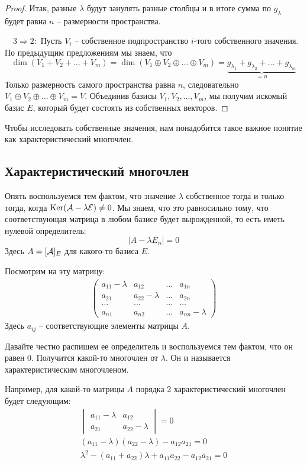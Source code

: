 \begin{proof}
    \quad Итак, разные $\lambda$ будут занулять разные столбцы и в итоге сумма по $g_\lambda$ будет равна $n$ -- размерности пространства.

    $\quad 3 \Rightarrow 2:$ Пусть $V_i$ -- собственное подпространство $i$-того собственного значения.
    По предыдущим предложениям мы знаем, что \[ \dim(V_1 + V_2 + \dots + V_m) 
    = \dim(V_1 \oplus V_2 \oplus \dots \oplus V_m)
    =  \underbrace{g_{\lambda_1} + g_{\lambda_2} + \dots + g_{\lambda_m}}_{ = n} \]
    \quad Только размерность самого пространства равна $n$, следовательно $V_1 \oplus V_2 \oplus \dots \oplus V_m = V$. 
    Объединив базисы $V_1, V_2, \dots, V_m$, мы получим искомый базис $E$, который будет состоять из собственных векторов.
\end{proof}

\vspace{5mm}

Чтобы исследовать собственные значения, нам понадобится такое важное понятие как характеристический многочлен.

\subsection{Характеристический многочлен}
Опять воспользуемся тем фактом, что значение $\lambda$ собственное тогда и только тогда, когда $\operatorname{Ker}(\mathcal{A} - \lambda\mathcal{E}) \neq 0$.
Мы знаем, что это равносильно тому, что соответствующая матрица в любом базисе будет вырожденной, то есть иметь нулевой определитель: \[ |A - \lambda E_n| = 0 \]
Здесь $A = [\mathcal{A}]_E$ для какого-то базиса $E$.

Посмотрим на эту матрицу:
\begin{gather*}
    \begin{pmatrix}
        a_{11} - \lambda & a_{12} & \dots & a_{1n} \\
        a_{21} & a_{22} - \lambda  & \dots & a_{2n} \\
        \dots & \dots & \dots & \dots \\
        a_{n1} & a_{n2} & \dots & a_{nn} - \lambda 
    \end{pmatrix}
\end{gather*}
Здесь $a_{ij}$ -- соответствующие элементы матрицы $A$.

Давайте честно распишем ее определитель и воспользуемся тем фактом, что он равен 0.
Получится какой-то многочлен от $\lambda$.
Он и называется характеристическим многочленом.

Например, для какой-то матрицы $A$ порядка 2 характеристический многочлен будет следующим:
\begin{gather*}
    \begin{vmatrix}
        a_{11} - \lambda & a_{12} \\
        a_{21} & a_{22} - \lambda
    \end{vmatrix} = 0 \\
    (a_{11} - \lambda)(a_{22} - \lambda) - a_{12}a_{21} = 0 \\
    \lambda^2 - (a_{11} + a_{22})\lambda + a_{11}a_{22} - a_{12}a_{21} = 0
\end{gather*}

